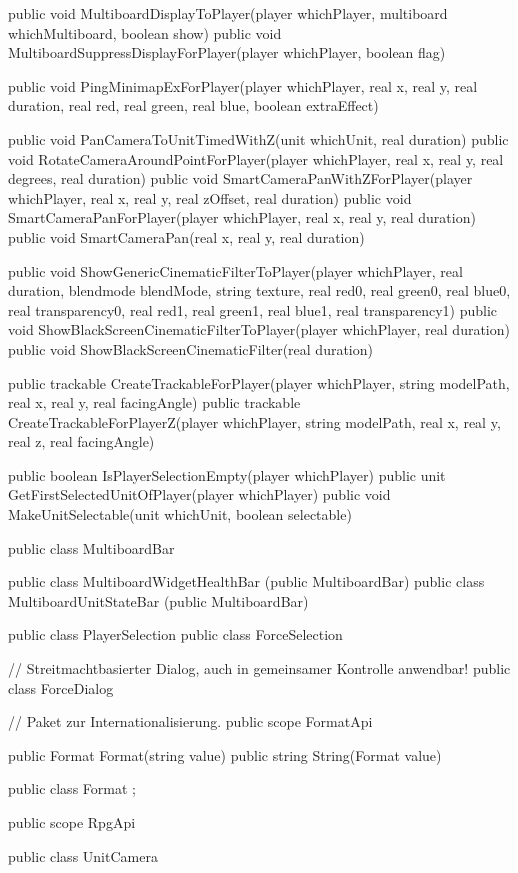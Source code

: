 {{		public void MultiboardDisplayToPlayer(player whichPlayer, multiboard whichMultiboard, boolean show)
		public void MultiboardSuppressDisplayForPlayer(player whichPlayer, boolean flag)

		public void PingMinimapExForPlayer(player whichPlayer, real x, real y, real duration, real red, real green, real blue, boolean extraEffect)

		public void PanCameraToUnitTimedWithZ(unit whichUnit, real duration)
		public void RotateCameraAroundPointForPlayer(player whichPlayer, real x, real y, real degrees, real duration)
		public void SmartCameraPanWithZForPlayer(player whichPlayer, real x, real y, real zOffset, real duration)
		public void SmartCameraPanForPlayer(player whichPlayer, real x, real y, real duration)
		public void SmartCameraPan(real x, real y, real duration)

		public void ShowGenericCinematicFilterToPlayer(player whichPlayer, real duration, blendmode blendMode, string texture, real red0, real green0, real blue0, real transparency0, real red1, real green1, real blue1, real transparency1)
		public void ShowBlackScreenCinematicFilterToPlayer(player whichPlayer, real duration)
		public void ShowBlackScreenCinematicFilter(real duration)
		
		public trackable CreateTrackableForPlayer(player whichPlayer, string modelPath, real x, real y, real facingAngle)
		public trackable CreateTrackableForPlayerZ(player whichPlayer, string modelPath, real x, real y, real z, real facingAngle)

		public boolean IsPlayerSelectionEmpty(player whichPlayer)
		public unit GetFirstSelectedUnitOfPlayer(player whichPlayer)
		public void MakeUnitSelectable(unit whichUnit, boolean selectable)

		public class MultiboardBar


		public class MultiboardWidgetHealthBar (public MultiboardBar)
		public class MultiboardUnitStateBar (public MultiboardBar)
		

		public class PlayerSelection
		public class ForceSelection

		// Streitmachtbasierter Dialog, auch in gemeinsamer Kontrolle anwendbar!
		public class ForceDialog
	}

	// Paket zur Internationalisierung.
	public scope FormatApi
	{
		public Format Format(string value)
		public string String(Format value)

		public class Format
		{
		};
	}

	public scope RpgApi
	{
		public class UnitCamera

}}
